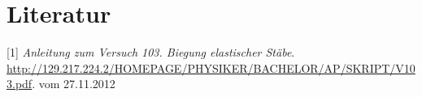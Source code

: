 
\section*{Literatur}

[1] \emph{Anleitung zum Versuch 103. Biegung elastischer
  Stäbe}. \url{http://129.217.224.2/HOMEPAGE/PHYSIKER/BACHELOR/AP/SKRIPT/V103.pdf}. vom 27.11.2012

